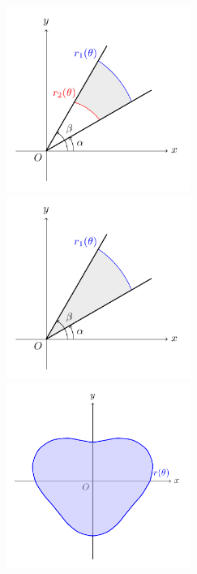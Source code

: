 \begin{figure}[H]
	\centering
	\begin{minipage}{0.49\linewidth}
		\centering
        \includegraphics[width=6cm]{figure/p9_1_3.pdf}
        \caption{}
        \label{p9_1_3}
	\end{minipage}
	\begin{minipage}{0.49\linewidth}
		\centering
		\includegraphics[width=6cm]{figure/p9_1_4.pdf}
        \caption{}
        \label{p9_1_4}
	\end{minipage}

    \begin{minipage}{0.3\linewidth}
		\centering
		\includegraphics[width=6cm]{figure/p9_1_5.pdf}
        \caption{}
        \label{p9_1_5}
	\end{minipage}
\end{figure}

